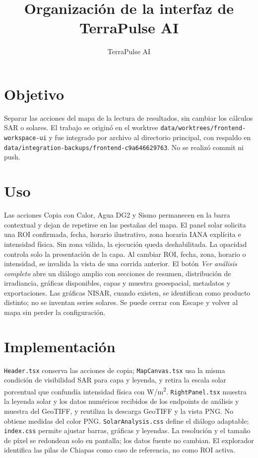 \documentclass[11pt]{article}
\title{Organización de la interfaz de TerraPulse AI}
\author{TerraPulse AI}
\date{}
\begin{document}
\maketitle
\section{Objetivo}
Separar las acciones del mapa de la lectura de resultados, sin cambiar los cálculos SAR o solares. El trabajo se originó en el worktree \texttt{data/worktrees/frontend-workspace-ui} y fue integrado por archivo al directorio principal, con respaldo en \texttt{data/integration-backups/frontend-c9a646629763}. No se realizó commit ni push.
\section{Uso}
Las acciones Copia con Calor, Agua DG2 y Sismo permanecen en la barra contextual y dejan de repetirse en las pestañas del mapa. El panel solar solicita una ROI confirmada, fecha, horario ilustrativo, zona horaria IANA explícita e intensidad física. Sin zona válida, la ejecución queda deshabilitada. La opacidad controla solo la presentación de la capa. Al cambiar ROI, fecha, zona, horario o intensidad, se invalida la vista de una corrida anterior.
El botón \textit{Ver análisis completo} abre un diálogo amplio con secciones de resumen, distribución de irradiancia, gráficas disponibles, capas y muestra geoespacial, metadatos y exportaciones. Las gráficas NISAR, cuando existen, se identifican como producto distinto; no se inventan series solares. Se puede cerrar con Escape y volver al mapa sin perder la configuración.
\section{Implementación}
\texttt{Header.tsx} conserva las acciones de copia; \texttt{MapCanvas.tsx} usa la misma condición de visibilidad SAR para capa y leyenda, y retira la escala solar porcentual que confundía intensidad física con W/m\textsuperscript{2}. \texttt{RightPanel.tsx} muestra la leyenda solar y los datos numéricos recibidos de los endpoints de análisis y muestra del GeoTIFF, y reutiliza la descarga GeoTIFF y la vista PNG. No obtiene medidas del color PNG. \texttt{SolarAnalysis.css} define el diálogo adaptable; \texttt{index.css} permite ajustar barras, gráficas y leyendas. La resolución y el tamaño de píxel se redondean solo en pantalla; los datos fuente no cambian. El explorador identifica las pilas de Chiapas como caso de referencia, no como ROI activa.
\end{document}
